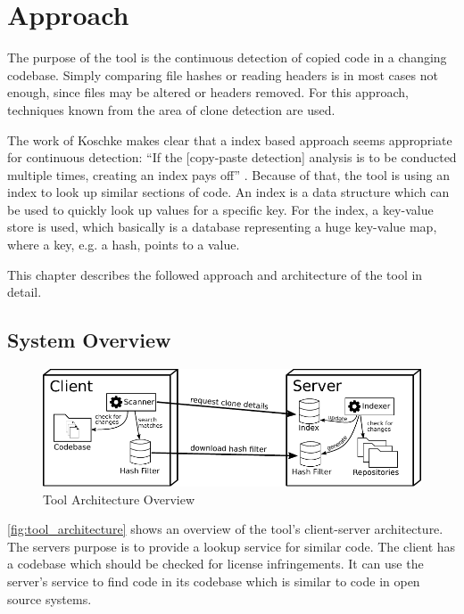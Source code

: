 
\chapter{Approach}\label{chapter:approach}
The purpose of the tool is the continuous detection of copied code in a changing codebase.
Simply comparing file hashes or reading headers is in most cases not enough, since files may be altered or headers removed.
For this approach, techniques known from the area of clone detection are used.

The work of Koschke makes clear that a index based approach seems appropriate for continuous detection:
\enquote{If the [copy-paste detection] analysis is to be conducted multiple times, creating an index pays off} \cite{koschke2014large}.
Because of that, the tool is using an index to look up similar sections of code.
An index is a data structure which can be used to quickly look up values for a specific key.
For the index, a key-value store is used, which basically is a database representing a huge key-value map, where a key, e.g. a hash, points to a value.

This chapter describes the followed approach and architecture of the tool in detail.

\section{System Overview}
\begin{figure}[h]
	\centering
	\includegraphics[width=\linewidth]{figures/architecture_overview.pdf}
	\caption{Tool Architecture Overview}\label{fig:tool_architecture}
\end{figure}
\autoref{fig:tool_architecture} shows an overview of the tool's client-server architecture.
The servers purpose is to provide a lookup service for similar code.
The client has a codebase which should be checked for license infringements.
It can use the server's service to find code in its codebase which is similar to code in open source systems.

